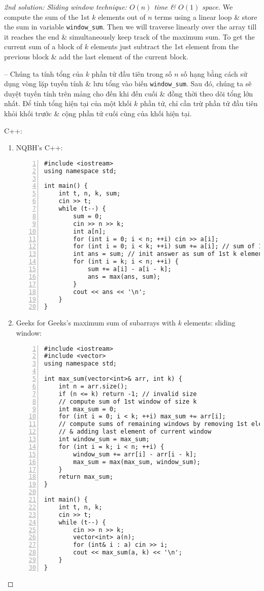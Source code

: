 \documentclass{article}
\begin{document}
\begin{proof}[2nd solution: Sliding window technique: $O(n)$ time \& $O(1)$ space]
    We compute the sum of the 1st $k$ elements out of $n$ terms using a linear loop \& store the sum in variable \verb|window_sum|. Then we will traverse linearly over the array till it reaches the end \& simultaneously keep track of the maximum sum. To get the current sum of a block of $k$ elements just subtract the 1st element from the previous block \& add the last element of the current block.

    -- Chúng ta tính tổng của $k$ phần tử đầu tiên trong số $n$ số hạng bằng cách sử dụng vòng lặp tuyến tính \& lưu tổng vào biến \verb|window_sum|. Sau đó, chúng ta sẽ duyệt tuyến tính trên mảng cho đến khi đến cuối \& đồng thời theo dõi tổng lớn nhất. Để tính tổng hiện tại của một khối $k$ phần tử, chỉ cần trừ phần tử đầu tiên khỏi khối trước \& cộng phần tử cuối cùng của khối hiện tại.

    C++:
    \begin{enumerate}
        \item NQBH's C++:
        \begin{Verbatim}[numbers=left,xleftmargin=5mm]
#include <iostream>
using namespace std;

int main() {
    int t, n, k, sum;
    cin >> t;
    while (t--) {
        sum = 0;
        cin >> n >> k;
        int a[n];
        for (int i = 0; i < n; ++i) cin >> a[i];
        for (int i = 0; i < k; ++i) sum += a[i]; // sum of 1st k elements
        int ans = sum; // init answer as sum of 1st k elements
        for (int i = k; i < n; ++i) {
            sum += a[i] - a[i - k];
            ans = max(ans, sum);
        }
        cout << ans << '\n';
    }
}
        \end{Verbatim}
        \item Geeks for Geeks's  maximum sum of subarrays with $k$ elements: sliding window:
        \begin{Verbatim}[numbers=left,xleftmargin=5mm]
#include <iostream>
#include <vector>
using namespace std;

int max_sum(vector<int>& arr, int k) {
    int n = arr.size();
    if (n <= k) return -1; // invalid size
    // compute sum of 1st window of size k
    int max_sum = 0;
    for (int i = 0; i < k; ++i) max_sum += arr[i];
    // compute sums of remaining windows by removing 1st element of previous window
    // & adding last element of current window
    int window_sum = max_sum;
    for (int i = k; i < n; ++i) {
        window_sum += arr[i] - arr[i - k];
        max_sum = max(max_sum, window_sum);
    }
    return max_sum;
}

int main() {
    int t, n, k;
    cin >> t;
    while (t--) {
        cin >> n >> k;
        vector<int> a(n);
        for (int& i : a) cin >> i;
        cout << max_sum(a, k) << '\n';
    }
}
        \end{Verbatim}
    \end{enumerate}
\end{proof}
\end{document}
